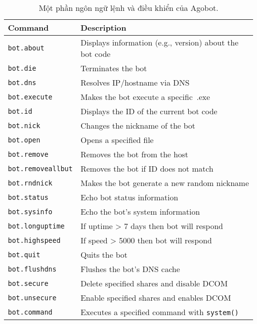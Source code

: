 \begin{table}[ht!]
	\caption{Một phần ngôn ngữ lệnh và điều khiển của Agobot.}\label{table:botcmd}
	\centering
	\footnotesize
	\begin{tabular}{l l}
		\toprule
		\textbf{Command} &
		\textbf{Description} \\
		\midrule
		\texttt{bot.about} & Displays information (e.g., version) about the bot code \\
		\texttt{bot.die} & Terminates the bot \\
		\texttt{bot.dns} & Resolves IP/hostname via DNS \\
		\texttt{bot.execute} & Makes the bot execute a specific~.exe \\
		\texttt{bot.id} & Displays the ID of the current bot code \\
		\texttt{bot.nick} & Changes the nickname of the bot \\
		\texttt{bot.open} & Opens a specified file \\
		\texttt{bot.remove} & Removes the bot from the host \\
		\texttt{bot.removeallbut} & Removes the bot if ID does not match \\
		\texttt{bot.rndnick} & Makes the bot generate a new random nickname \\
		\texttt{bot.status} & Echo bot status information \\
		\texttt{bot.sysinfo} & Echo the bot's system information \\
		\texttt{bot.longuptime} & If uptime > 7 days then bot will respond \\
		\texttt{bot.highspeed} & If speed > 5000 then bot will respond \\
		\texttt{bot.quit} & Quits the bot \\
		\texttt{bot.flushdns} & Flushes the bot's DNS cache \\
		\texttt{bot.secure} & Delete specified shares and disable DCOM \\
		\texttt{bot.unsecure} & Enable specified shares and enables DCOM \\
		\texttt{bot.command} & Executes a specified command with \verb|system()| \\
		\bottomrule
	\end{tabular}
\end{table}


